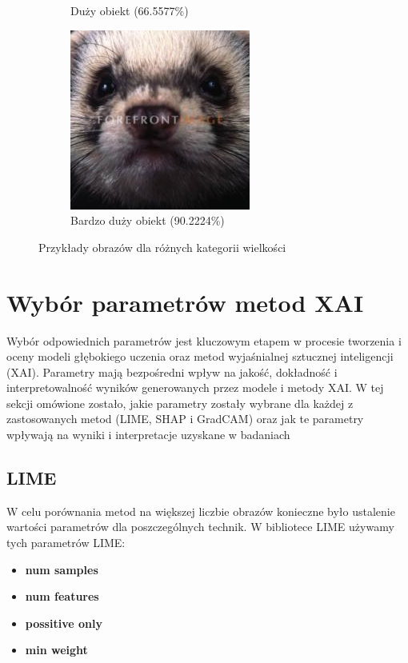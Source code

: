 \begin{figure}[h]
\begin{subfigure}[b]{0.3\textwidth}
		\caption{Duży obiekt (66.5577\%)}  \label{}
	\end{subfigure}
	\begin{subfigure}[b]{0.3\textwidth}
		\centering\includegraphics[width=.9\textwidth]{img/examples/size_category_verybig}
		\caption{Bardzo duży obiekt (90.2224\%)}  \label{}
	\end{subfigure}
	\caption{Przykłady obrazów dla różnych kategorii wielkości}
	\label{rys:examples_size_cat}
\end{figure}

\section*{Wybór parametrów metod XAI}
Wybór odpowiednich parametrów jest kluczowym etapem w procesie tworzenia i oceny modeli głębokiego uczenia oraz metod wyjaśnialnej sztucznej inteligencji (XAI).
Parametry mają bezpośredni wpływ na jakość, dokładność i interpretowalność wyników generowanych przez modele i metody XAI.
W tej sekcji omówione zostało, jakie parametry zostały wybrane dla każdej z zastosowanych metod (LIME, SHAP i GradCAM) oraz jak te parametry wpływają na wyniki i interpretacje uzyskane w badaniach

\subsection*{LIME}
W celu porównania metod na większej liczbie obrazów konieczne było ustalenie wartości parametrów dla poszczególnych technik.
W bibliotece LIME używamy tych parametrów LIME:
\begin{itemize}
	\item \textbf{num samples}
	\item \textbf{num features}
	\item \textbf{possitive only}
	\item \textbf{min weight}
\end{itemize}

